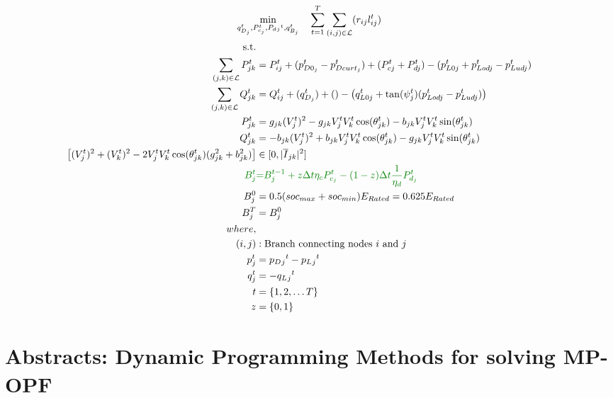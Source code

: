 \begin{gather}
    \min_{q_{D_j}^t,
	P_{c_j}^t, P_d{_j}^t, q_{B_j}^t} \quad
	\sum_{t = 1}^{T} \sum_{(i, j) \in \mathcal{L}} (r_{ij}l_{ij}^t) \\
	\begin{align}
		\text{s.t.} & {}\nonumber \\
		{ \sum_{(j, k) \in \mathcal{L}} P^t_{jk} } &= {P_{ij}^t  + (p^t_{D0_j} - p^t_{Dcurt_j} ) + (P^t_{cj} + P^t_{dj}) - (p^t_{L0j} + p^t_{Lodj} - p^t_{Ludj} ) } && \\
		{ \sum_{(j, k) \in \mathcal{L}} Q^t_{jk} } &= {Q_{ij}^t  + (q^t_{D_j}) + () - \left(q^t_{L0j} + \tan(\psi^t_j)(p^t_{Lodj} - p^t_{Ludj}) \right) } && \\
		{P^t_{jk}} &= { g_{jk} (V^t_j)^2 - g_{jk} V^t_j V^t_k \cos(\theta^t_{jk}) - b_{jk} V^t_j V^t_k \sin(\theta^t_{jk}) } && \\
		{Q^t_{jk}} &= { -b_{jk} (V^t_j)^2 + b_{jk} V^t_j V^t_k \cos(\theta^t_{jk}) - g_{jk} V^t_j V^t_k \sin(\theta^t_{jk}) } && \\
		{\left[(V^t_j)^2 + (V^t_k)^2 - 2V^t_j V^t_k \cos(\theta^t_{jk}) (g_{jk}^2 + b_{jk}^2)  \right] } &\in {[0, |\overline{I}_{jk}|^2]} && \\
		{\color{darkgreen}{ B_{j}^{t} }} &\color{darkgreen}{=} { \color{darkgreen}{ B_{j}^{t-1} + z \Delta t  \eta_c P_{c_j}^t - (1-z) \Delta t\frac{1}{\eta_d} P_{d_j}^t } } \\
		{ B_{j}^{0} } &= { 0.5(soc_{max}+soc_{min})E_{Rated} = 0.625E_{Rated}} \\
		{ B_{j}^{T} } &= { B_{j}^{0}} \\
		{where,} & {} \\
		{(i, j)} &: {\text{Branch connecting nodes $i$ and $j$}} \\
		{p_j^t} &= {p_D{_j}^t - p_L{_j}^t} \\
		{q_j^t} &= {-q_L{_j}^t} \\
		{t} &= {\{1, 2, \ldots T\}} \\
		{z} &= {\{0, 1\}}
	\end{align}
\end{gather}

\chapter{Abstracts: Dynamic Programming Methods for solving MP-OPF}

